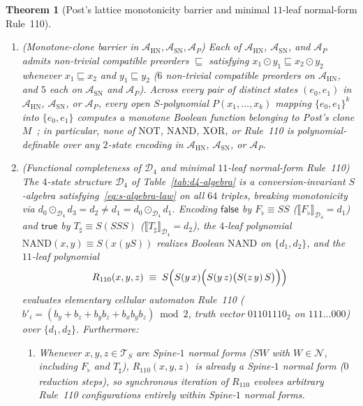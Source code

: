\documentclass[11pt,reqno]{amsart}
\numberwithin{equation}{section}
\theoremstyle{plain}
\newtheorem{theorem}{Theorem}[section]
\theoremstyle{definition}
\theoremstyle{remark}
\begin{document}
\begin{theorem}[Post's lattice monotonicity barrier and minimal $11$-leaf normal-form Rule~110]
\label{thm:clones-rule110}
\begin{enumerate}[label=(\roman*)]
\item \emph{(Monotone-clone barrier in $\mathcal{A}_{\mathrm{HN}}, \mathcal{A}_{\mathrm{SN}}, \mathcal{A}_P$)} Each of $\mathcal{A}_{\mathrm{HN}}$, $\mathcal{A}_{\mathrm{SN}}$, and $\mathcal{A}_P$ admits non-trivial compatible preorders $\sqsubseteq$ satisfying $x_1 \odot y_1 \sqsubseteq x_2 \odot y_2$ whenever $x_1 \sqsubseteq x_2$ and $y_1 \sqsubseteq y_2$ ($6$ non-trivial compatible preorders on $\mathcal{A}_{\mathrm{HN}}$, and $5$ each on $\mathcal{A}_{\mathrm{SN}}$ and $\mathcal{A}_P$). Across every pair of distinct states $(e_0, e_1)$ in $\mathcal{A}_{\mathrm{HN}}$, $\mathcal{A}_{\mathrm{SN}}$, or $\mathcal{A}_P$, every open $S$-polynomial $P(x_1, \dots, x_k)$ mapping $\{e_0, e_1\}^k$ into $\{e_0, e_1\}$ computes a monotone Boolean function belonging to Post's clone $M$~\cite{Post1941}; in particular, none of $\mathrm{NOT}$, $\mathrm{NAND}$, $\mathrm{XOR}$, or Rule~110 is polynomial-definable over any $2$-state encoding in $\mathcal{A}_{\mathrm{HN}}$, $\mathcal{A}_{\mathrm{SN}}$, or $\mathcal{A}_P$.
\item \emph{(Functional completeness of $\mathcal{D}_4$ and minimal $11$-leaf normal-form Rule~110)} The $4$-state structure $\mathcal{D}_4$ of Table~\ref{tab:d4-algebra} is a conversion-invariant $S$-algebra satisfying~\eqref{eq:s-algebra-law} on all $64$ triples, breaking monotonicity via $d_0 \odot_{\mathcal{D}_4} d_3 = d_2 \neq d_1 = d_0 \odot_{\mathcal{D}_4} d_1$. Encoding $\mathsf{false}$ by $F_{\flat} \equiv S S$ ($\llbracket F_{\flat} \rrbracket_{\mathcal{D}_4} = d_1$) and $\mathsf{true}$ by $T_{\sharp} \equiv S(S S S)$ ($\llbracket T_{\sharp} \rrbracket_{\mathcal{D}_4} = d_2$), the $4$-leaf polynomial $\mathrm{NAND}(x, y) \equiv S(x(y S))$ realizes Boolean $\mathrm{NAND}$ on $\{d_1, d_2\}$, and the $11$-leaf polynomial
\begin{equation}
\label{eq:rule110-poly}
R_{110}(x, y, z) \;\equiv\; S\Bigl(S(y\,x)\Bigl(S(y\,z)\bigl(S(z\,y)\,S\bigr)\Bigr)\Bigr)
\end{equation}
evaluates elementary cellular automaton Rule~110 ($b'_i = (b_y + b_z + b_y b_z + b_x b_y b_z) \bmod 2$, truth vector $01101110_2$ on $111 \dots 000$) over $\{d_1, d_2\}$. Furthermore:
\begin{enumerate}
\item[(a)] Whenever $x, y, z \in \mathcal{T}_S$ are Spine-$1$ normal forms ($S W$ with $W \in \mathcal{N}$, including $F_{\flat}$ and $T_{\sharp}$), $R_{110}(x, y, z)$ is already a Spine-$1$ normal form ($0$ reduction steps), so synchronous iteration of $R_{110}$ evolves arbitrary Rule~110 configurations entirely within Spine-$1$ normal forms.

\end{enumerate}
\end{enumerate}
\end{theorem}
\end{document}
